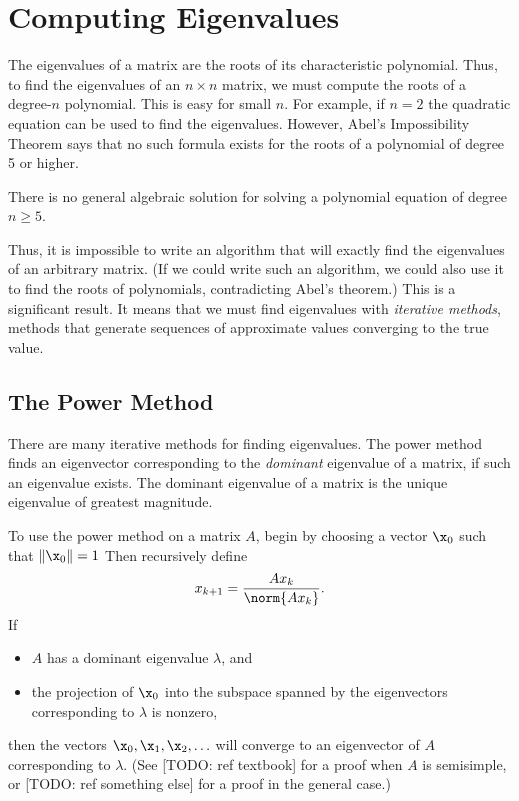 \section*{Computing Eigenvalues} %

The eigenvalues of a matrix are the roots of its characteristic polynomial.
Thus, to find the eigenvalues of an $n \times n$ matrix, we must compute the roots of a degree-$n$ polynomial.
This is easy for small $n$.
For example, if $n=2$ the quadratic equation can be used to find the eigenvalues.
However, Abel's Impossibility Theorem says that no such formula exists for the roots of a polynomial of degree 5 or higher.

\begin{theorem}
There is no general algebraic solution for solving a polynomial equation of degree $n\geq5$.
\label{thm:Abel}
\end{theorem}

Thus, it is impossible to write an algorithm that will exactly find the eigenvalues of an arbitrary matrix.
(If we could write such an algorithm, we could also use it to find the roots of polynomials, contradicting Abel's theorem.)
This is a significant result.
It means that we must find eigenvalues with \emph{iterative methods}, methods that generate sequences of approximate values converging to the true value.

\subsection*{The Power Method} %

There are many iterative methods for finding eigenvalues.
The power method finds an eigenvector corresponding to the \emph{dominant} eigenvalue of a matrix, if such an eigenvalue exists.
The dominant eigenvalue of a matrix is the unique eigenvalue of greatest magnitude.

To use the power method on a matrix $A$, begin by choosing a vector $\x_0$ such that $\|\x_0\|=1$
Then recursively define
\[
x_{k+1}=\frac{Ax_k}{\norm{Ax_k}}.
\]
If
\begin{itemize}
\item $A$ has a dominant eigenvalue $\lambda$, and
\item the projection of $\x_0$ into the subspace spanned by the eigenvectors corresponding to $\lambda$ is nonzero,
\end{itemize}
then the vectors $\x_0, \x_1, \x_2, \ldots$ will converge to an eigenvector of $A$ corresponding to $\lambda$.
(See [TODO: ref textbook] for a proof when $A$ is semisimple, or [TODO: ref something else] for a proof in the general case.)

